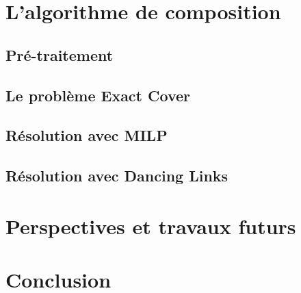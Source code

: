 \documentclass[a4paper]{easychair}
\begin{document}
\section{L'algorithme de composition}
\subsection{Pré-traitement}
\subsection{Le problème Exact Cover}
\subsection{Résolution avec MILP}
\subsection{Résolution avec Dancing Links}

\section{Perspectives et travaux futurs}

\section{Conclusion}
\label{sec:conclusion}



\end{document}
